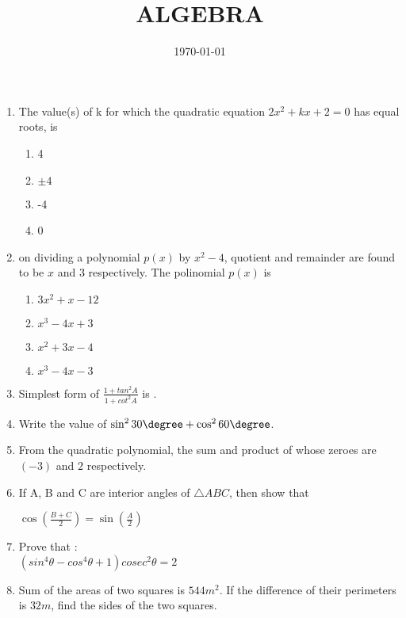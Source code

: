 \documentclass[12pt]{article}
\begin{document}
	\title{ALGEBRA}
\date{ \today}
\maketitle
\begin{enumerate}
		\section*{ALGEBRA CBSE - 10}
\item
        The value(s) of k for which the quadratic equation $2x^2 + kx + 2 = 0$ has equal roots, is 
\begin{enumerate}
\item 4 
\item $\pm 4$
\item -4 
\item 0 
\end{enumerate}

\item 
	on dividing a polynomial $p(x)$ by $x^2 - 4$, 
quotient and remainder are found to be $x$ and $3$ 
respectively. The polinomial $p(x)$ is 
\begin{enumerate}
\item $3x^2 + x - 12$
\item $x^3 - 4x + 3$
\item $x^2 + 3x - 4$
\item $x^3 - 4x - 3$
\end{enumerate}

\item 
	Simplest form of $\frac{1 + tan^2 A}{1 + cot^2 A}$ is \underline{\hspace{2cm}}.

\item 
	Write the value of $\sin^2 30\degree + \cos^2 60\degree$.

\item
	From the quadratic polynomial, the sum and product  of whose zeroes are $(-3)$ and $2$ respectively.

\item 
	If A, B and C are interior angles of $ \triangle ABC$, then show that
	
	$\cos \left(\frac{B + C}{2}\right)=\sin \left(\frac{A}{2}\right)$
      
\item Prove that : \\
        $(sin^4\theta - cos^4\theta + 1)cosec^2\theta = 2$
  
\item
	Sum of the areas of two squares is $544 m^2$. If the difference of their
perimeters is $32 m$, find the sides of the two squares.


\end{enumerate}
\end{document}
